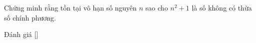\ifshowproblem
\begin{problem}\label{problem:CHN-2015-TST2-P6}
	Chứng minh rằng tồn tại vô hạn số nguyên $n$ sao cho $n^2 + 1$ là số không có thừa số chính phương.
\end{problem}
\fi

\ifshowinfo
Đánh giá [\textbf{}]\footnotemark
{}
\fi